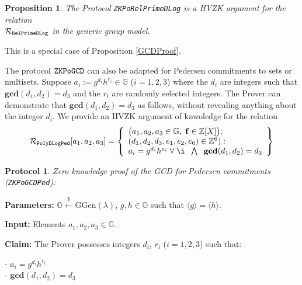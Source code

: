 \documentclass[11pt, lettersize, notitlepage, leqno, footskip=0.6cm]{article}
\newcommand{\bz}{\mathbb Z}
\newcommand{\ttt}{\texttt}
\newcommand{\bG}{\mathbb{G}}
\newcommand{\la}{\langle}
\newcommand{\ra}{\rangle}
\newcommand{\mc}{\mathcal}
\newcommand{\mb}{\mathbb}
\newcommand{\mbf}{\mathbf}
\newcommand{\mr}{\mathrm}
\newcommand{\lamb}{\lambda}
\newcommand{\noin}{\noindent}
\newcommand{\GCD}{\mbf{gcd}}
\newtheorem{Prop}[Thm]{Proposition}
\newtheorem{Prot}[Thm]{Protocol}
\numberwithin{equation}{section}
\begin{document}
\vspace{0.1cm}

\begin{Prop} The Protocol \verb|ZKPoRelPrimeDLog| is a HVZK argument for the relation\\ $\mc{R}_{{\tt{RelPrimeDLog}}}$ in the generic group model.\end{Prop}

\begin{prf} This is a special case of Proposition \ref{GCDProof}.\end{prf}

The protocol $\tt{ZKPoGCD}$ can also be adapted for Pedersen commitments to sets or multisets. Suppose $ a_i:= g^{d_i}h^{r_i}\in \bG $ ($i=1,2,3$) where the $d_i$ are integers such that $\GCD(d_1,d_2) = d_3$ and the $r_i$ are randomly selected integers. The Prover can demonstrate that $\GCD(d_1,d_2) = d_3$ as follows, without revealing anything about the integer $d_i$. We provide an HVZK argument of knwoledge for the relation \[
  \mc{R}_{{\ttt{PolyDLogPed}}}[a_1,a_2,a_3] = \left\{\begin{array}{l}
    \big(a_1,a_2,a_3\in\mb{G},\;\mbf{f}\in\bz[X]\big);\\
    (d_1, d_2,d_3, e_1,e_2, e_6)\in\mb{Z}^6): \\
    a_i = g^{d_i}h^{e_i}\;\forall\;\i\;\; \bigwedge\;\; \GCD(d_1,d_2) = d_3  \end{array}\right\}
\] 

\begin{Prot} \normalfont \hypertarget{GCDPedersen}{\textit{Zero knowledge proof of the GCD for Pedersen commitments}} (\verb|ZKPoGCDPed|):\end{Prot} \vspace{-0.3cm}

\noin \textbf{Parameters:} $\mb{G}\xleftarrow{\$} \mr{GGen}(\lamb)$,  $g,h\in \mb{G}$ such that $\la g \ra = \la h \ra$.

\noin \textbf{Input:} Elements $a_1, a_2, a_3\in \mb{G}$.

\noin \textbf{Claim:} The Prover possesses integers $d_i$, $r_i$ ($i=1,2,3$) such that:

\noin - $a_i = g^{d_i}h^{r_i}$\\
\noin - $\GCD(d_1, d_2) = d_3$
\end{document}
